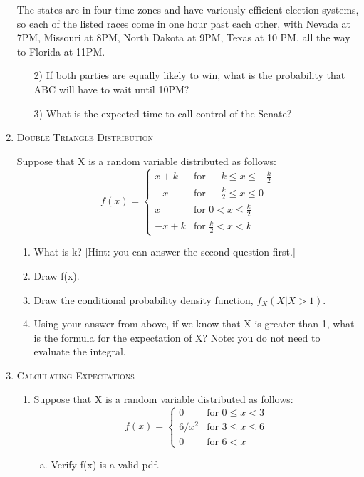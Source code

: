 \documentclass[10pt,letterpaper]{article}
\theoremstyle{definition}
\numberwithin{equation}{section}
\begin{document}
\begin{enumerate}[I]
The states are in four time zones and have variously efficient election systems, so each of the listed races come in one hour past each other, with Nevada at 7PM, Missouri at 8PM, North Dakota at 9PM, Texas at 10 PM, all the way to Florida at 11PM.
\begin{enumerate}
\item[2)] If both parties are equally likely to win, what is the probability that ABC will have to wait until 10PM?
\vfill
\item[3)] What is the expected time to call control of the Senate?
\vfill
\end{enumerate}


\pagebreak
\item \textsc{Double Triangle Distribution} 

Suppose that X is a random variable distributed as follows:
$$f(x)=\begin{cases} x+k & \text{for } -k\leq x \leq -\frac{k}{2}\\  -x & \text{for } -\frac{k}{2} \leq x \leq 0\\ x  & \text{for } 0<x\leq\frac{k}{2}\\ -x+k& \text{for } \frac{k}{2}<x<k \end{cases}$$
\begin{enumerate}[1)]
\item What is k? [Hint: you can answer the second question first.] %
\vfill

\pagebreak
\item Draw f(x).
\vfill

\item Draw the conditional probability density function, $f_X(X|X>1)$.
\vfill

\item Using your answer from above, if we know that X is greater than 1, what is the formula for the expectation of X?  Note: you do not need to evaluate the integral.
\vfill

\end{enumerate}

\pagebreak
\item \textsc{Calculating Expectations}
\begin{enumerate}[1)]

\item Suppose that X is a random variable distributed as follows:
$$f(x)=\begin{cases} 0 & \text{for } 0\leq x < 3 \\ 6/x^2  & \text{for }  3\leq x\leq 6\\ 0 &\text{for } 6< x
\end{cases}$$
\begin{enumerate}[a)]
\item Verify f(x) is a valid pdf. %
\vfill


\end{enumerate}
\end{enumerate}
\end{enumerate}
\end{document}
